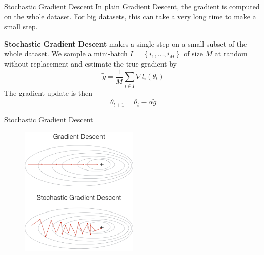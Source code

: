 \documentclass{beamer}
\begin{document}
\begin{frame}{Stochastic Gradient Descent}
    In plain Gradient Descent, the gradient is computed on the whole dataset.
    For big datasets, this can take a very long time to make a small step.

    \textbf{Stochastic Gradient Descent} makes a single step on a small subset of the whole dataset.
    We sample a mini-batch $I = \left\{i_1, \dots, i_M\right\}$ of size $M$ at random without replacement and estimate the true gradient by
    $$\tilde{g} = \frac{1}{M}\sum_{i \in I}\nabla l_i(\theta_t)$$
    The gradient update is then
    $$\theta_{t+1} = \theta_{t} - \alpha \tilde{g}$$
\end{frame}

\begin{frame}{Stochastic Gradient Descent}
    \begin{figure}
        \centering
        \includegraphics[width=0.5\textwidth]{./images/24_sgd.png}
    \end{figure}
\end{frame}
\end{document}
